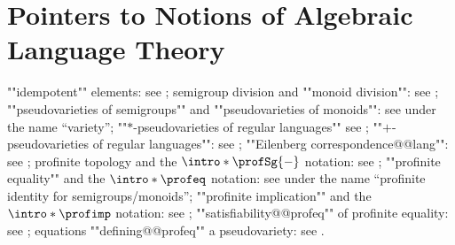 \section{Pointers to Notions of Algebraic Language Theory}
\label{apdx:pointers-pin}

\begin{itemize}
	\itemAP ""idempotent"" elements:
		see \cite[\S II.1.2, p.~14]{pin_mathematical_2022};
	\itemAP semigroup division and ""monoid division"":
		see \cite[\S II.3.3, p.~21]{pin_mathematical_2022};
	\itemAP ""pseudovarieties of semigroups"" and ""pseudovarieties of monoids"":
		see \cite[\S XI.1, p.~189]{pin_mathematical_2022} under the name ``variety'';
	\itemAP ""$\ast $-pseudovarieties of regular languages""
		see \cite[\S XIII.3, p.~226]{pin_mathematical_2022};
	\itemAP ""$+$-pseudovarieties of regular languages"":
		see \cite[\S XIII.4, ``Eilenberg’s $+$-varieties'', p.~229]{pin_mathematical_2022};
	\itemAP ""Eilenberg correspondence@@lang"":
		see \cite[Theorem XIII.4.10, p.~228]{pin_mathematical_2022};
	\itemAP profinite topology and the $\intro*\profSg{-}$ notation:
		see \cite[\S X.2, p.~178]{pin_mathematical_2022};
	\itemAP ""profinite equality"" and the $\intro*\profeq$ notation:
		see \cite[\S XI.3, p.~193]{pin_mathematical_2022} under
		the name ``profinite identity for semigroups/monoids'';
	\itemAP ""profinite implication"" and the $\intro*\profimp$ notation:
		see \cite[\S XIII.1, p.~223]{pin_mathematical_2022};
	\itemAP ""satisfiability@@profeq"" of profinite equality:
		see \cite[\S XI.3, p.~193]{pin_mathematical_2022};
	\itemAP equations ""defining@@profeq"" a pseudovariety:
		see \cite[\S XI.3.3, p.~194]{pin_mathematical_2022}.
\end{itemize}